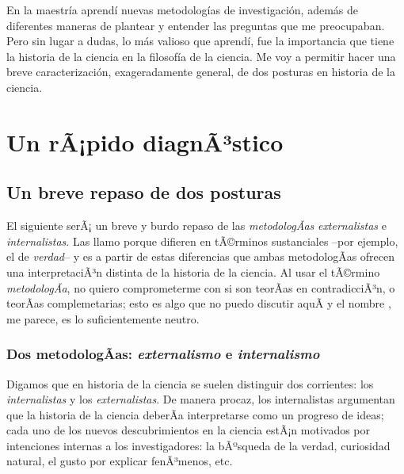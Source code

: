 En la maestría aprendí nuevas metodologías de investigación, además de diferentes maneras de plantear y entender las preguntas que me preocupaban. 
Pero sin lugar a dudas, lo más valioso que aprendí, fue la importancia que tiene la historia de la ciencia en la filosofía de la ciencia. 
Me voy a permitir hacer una breve caracterización, exageradamente general, de dos posturas en historia de la ciencia.


\chapter{Un rÃ¡pido diagnÃ³stico}

\section{Un breve repaso de dos posturas}

\noindent El siguiente serÃ¡ un breve y burdo repaso de las
\emph{metodologÃ­as} \emph{externalistas} e \emph{internalistas}. 
Las llamo  porque difieren en tÃ©rminos sustanciales
--por ejemplo, el de \emph{verdad}-- y es a partir de estas diferencias
que ambas metodologÃ­as ofrecen una interpretaciÃ³n distinta de la historia
de la ciencia. Al usar el tÃ©rmino \emph{metodologÃ­a}, no quiero
comprometerme con si son teorÃ­as en contradicciÃ³n, o teorÃ­as
complemetarias; esto es algo que no puedo discutir aquÃ­ y el nombre
, me parece, es lo suficientemente neutro.


\subsection{Dos metodologÃ­as: \emph{externalismo} e \emph{internalismo}}

\noindent Digamos que en historia de la ciencia se suelen distinguir dos
corrientes: los \emph{internalistas} y los \emph{externalistas}. De manera
procaz, los internalistas argumentan que la historia de la ciencia deberÃ­a
interpretarse como un progreso de ideas; cada uno de los nuevos
descubrimientos en la ciencia estÃ¡n motivados por intenciones internas
a los investigadores: la bÃºsqueda de la verdad, curiosidad natural, el
gusto por explicar fenÃ³menos, etc.

